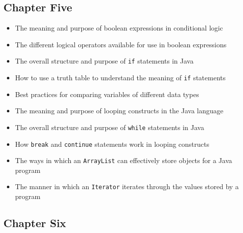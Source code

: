 \documentclass[11pt]{article}
\begin{document}
\subsection*{Chapter Five}

\begin{itemize}

  \item The meaning and purpose of boolean expressions in conditional logic
  \item The different logical operators available for use in boolean expressions
  \item The overall structure and purpose of {\tt if} statements in Java
  \item How to use a truth table to understand the meaning of {\tt if} statements
  \item Best practices for comparing variables of different data types
  \item The meaning and purpose of looping constructs in the Java language
  \item The overall structure and purpose of {\tt while} statements in Java
  \item How {\tt break} and {\tt continue} statements work in looping constructs
  \item The ways in which an {\tt ArrayList} can effectively store objects for a Java program
  \item The manner in which an {\tt Iterator} iterates through the values stored by a program

\end{itemize}

\subsection*{Chapter Six}
\end{document}
